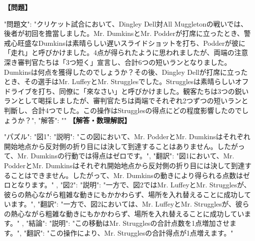 \documentclass[10pt,a4paper,oneside,openany]{ltjsbook}
\begin{document}
\begin{tcolorbox}[colback=softblue,colframe=primaryblue,title=\textbf{第 387 問：THE VILLAGE CRICKET MATCH.},arc=2mm,boxrule=1pt,breakable]
\textbf{【問題】}\par\vspace{0.3em}
{
  "問題文": "クリケット試合において、Dingley Dell対All Muggletonの戦いでは、後者が初回を擔當しました。Mr. DumkinsとMr. Podderが打席に立ったとき、警戒心旺盛なDumkinsは素晴らしい遅いスライドショットを打ち、Podderが彼に「走れ」と呼びかけました。4点が得られたように思われましたが、両端の注意深き審判官たちは「3つ短く」宣言し、合計6つの短いランとなりました。Dumkinsは何点を獲得したのでしょうか？その後、Dingley Dellが打席に立ったとき、その選手はMr. LuffeyとMr. Strugglesでした。Strugglesは素晴らしいオフドライブを打ち、同僚に「來なさい」と呼びかけました。観客たちは3つの鋭いランとして喝採しましたが、審判官たちは両端でそれぞれ2つずつの短いランと判斷し、合計4つでした。この操作はStrugglesの得点にどの程度影響したのでしょうか？",
  "解答": ""
}
\tcblower
\textbf{【解答・数理解説】}\par\vspace{0.3em}
{
  "パズル": {
    "図1": {
      "説明": "この図において、Mr. PodderとMr. Dumkinsはそれぞれ開始地点から反対側の折り目には決して到達することはありません。したがって、Mr. Dumkinsの行動では得点はゼロです。",
      "翻訳": "図1において、Mr. PodderとMr. Dumkinsはそれぞれ開始地点から反対側の折り目には決して到達することはできません。したがって、Mr. Dumkinsの動きにより得られる点数はゼロとなります。"
    },
    "図2": {
      "説明": "一方で、図2ではMr. LuffeyとMr. Strugglesが、彼らの熱心ながら粗雑な動きにもかかわらず、場所を入れ替えることに成功しています。",
      "翻訳": "一方で、図2においては、Mr. LuffeyとMr. Strugglesが、彼らの熱心ながら粗雑な動きにもかかわらず、場所を入れ替えることに成功しています。"
    },
    "結論": {
      "説明": "この移動はMr. Strugglesの合計点数を1点増加させます。",
      "翻訳": "この操作により、Mr. Strugglesの合計得点が1点増えます。"
    }
  }
}
\end{tcolorbox}
\end{document}
